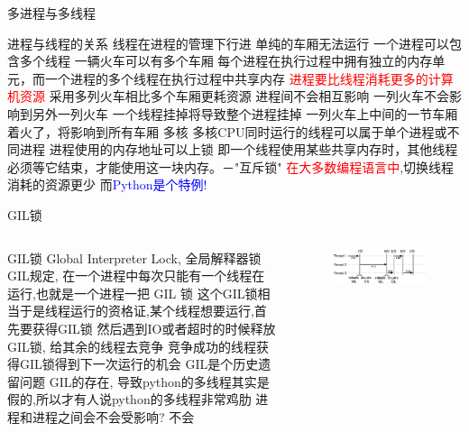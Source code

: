 \begin{frame}{多进程与多线程}
    \begin{myoutline}
        \1 进程与线程的关系
            \2 线程在进程的管理下行进
                \3 单纯的车厢无法运行
            \2 一个进程可以包含多个线程
                \3 一辆火车可以有多个车厢
                \3 每个进程在执行过程中拥有独立的内存单元，而一个进程的多个线程在执行过程中共享内存
            \2 \textcolor{red}{进程要比线程消耗更多的计算机资源}
                \3 采用多列火车相比多个车厢更耗资源
            \2 进程间不会相互影响
                \3 一列火车不会影响到另外一列火车
            \2 一个线程挂掉将导致整个进程挂掉
                \3 一列火车上中间的一节车厢着火了，将影响到所有车厢
        \1 多核
            \2 多核CPU同时运行的线程可以属于单个进程或不同进程
            \2 进程使用的内存地址可以上锁
                \3 即一个线程使用某些共享内存时，其他线程必须等它结束，才能使用这一块内存。－"互斥锁"
        \1 \textcolor{red}{在大多数编程语言中},切换线程消耗的资源更少
            \2 而\textcolor{blue}{Python是个特例!}
    \end{myoutline}
\end{frame}


\begin{frame}{GIL锁}
    \begin{columns}
        \begin{myoutline}
            \1 GIL锁
                \2 Global Interpreter Lock, 全局解释器锁
                \2 GIL规定, 在一个进程中每次只能有一个线程在运行,也就是一个进程一把 GIL 锁
                    \3 这个GIL锁相当于是线程运行的资格证,某个线程想要运行,首先要获得GIL锁
                    \3 然后遇到IO或者超时的时候释放GIL锁, 给其余的线程去竞争
                    \3 竞争成功的线程获得GIL锁得到下一次运行的机会
            \1 GIL是个历史遗留问题
                \2 GIL的存在, 导致python的多线程其实是假的,所以才有人说python的多线程非常鸡肋
                \2 进程和进程之间会不会受影响?
                    \3 不会
        \end{myoutline}
        \begin{figure}
            \centering
            \includegraphics[width=0.9\linewidth]{Images/gil.png}
        \end{figure}
    \end{columns}
\end{frame}

